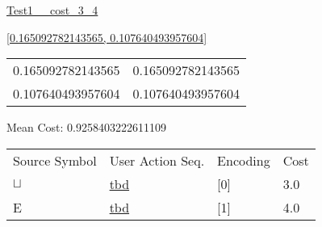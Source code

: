 \documentclass[12pt]{article}
\begin{document}
\noindent \url{Test1__cost_3_4}

\noindent \url{[0.165092782143565, 0.107640493957604]}

\noindent\begin{tt}
\begin{small}
\begin{bundle}{}
\end{bundle}
\end{small}
\end{tt}
\newpage%
\begin{tabular}{l l}0.165092782143565	&	0.165092782143565\\
0.107640493957604	&	0.107640493957604\\
\end{tabular}\newpage
\noindent
\noindent Mean Cost: 0.9258403222611109\\
\begin{tabular}{l l l l}
Source Symbol	&	User Action Seq.	&	Encoding	&	Cost\\
$\sqcup$	&	\url{tbd}	&	[0]	&	3.0\\
E	&	\url{tbd}	&	[1]	&	4.0\\
\end{tabular}
\end{document}
